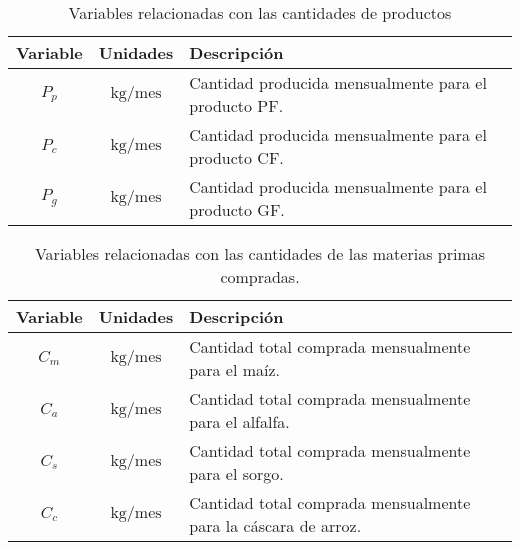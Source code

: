 \documentclass[a4paper,11pt]{article}
\begin{document}
\begin{table}[h!t]
  \centering
  \begin{tabular}{ | c | c | p{7cm} | }
    \hline
    \textbf{Variable} & \textbf{Unidades}          & \textbf{Descripción} \\ \hline
     \(P_p\)          & \(\text{kg} / \text{mes}\) & Cantidad producida mensualmente para el producto PF. \\ \hline
     \(P_c\)          & \(\text{kg} / \text{mes}\) & Cantidad producida mensualmente para el producto CF. \\ \hline
     \(P_g\)          & \(\text{kg} / \text{mes}\) & Cantidad producida mensualmente para el producto GF. \\ \hline
  \end{tabular}
  \caption{Variables relacionadas con las cantidades de productos}
\end{table}

\begin{table}[h!t]
  \centering
  \begin{tabular}{ | c | c | p{7cm} | }
    \hline
    \textbf{Variable} & \textbf{Unidades}          & \textbf{Descripción} \\ \hline
     \(C_m\)          & \(\text{kg} / \text{mes}\) & Cantidad total comprada mensualmente para el maíz. \\ \hline
     \(C_a\)          & \(\text{kg} / \text{mes}\) & Cantidad total comprada mensualmente para el alfalfa. \\ \hline
     \(C_s\)          & \(\text{kg} / \text{mes}\) & Cantidad total comprada mensualmente para el sorgo. \\ \hline
     \(C_c\)          & \(\text{kg} / \text{mes}\) & Cantidad total comprada mensualmente para la cáscara de arroz. \\ \hline
  \end{tabular}
  \caption{Variables relacionadas con las cantidades de las materias primas compradas.}
\end{table}
\end{document}

